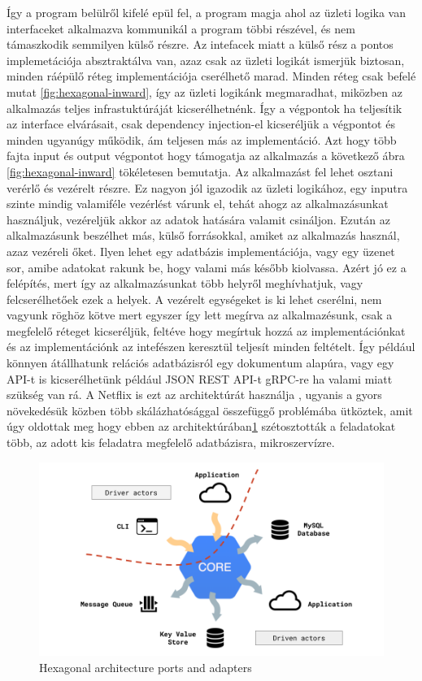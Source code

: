 Így a program belülről kifelé epül fel, a program magja ahol az üzleti logika van interfaceket alkalmazva kommunikál a program többi részével, és nem támaszkodik semmilyen külső részre. Az intefacek miatt a külső rész a pontos implemetációja absztraktálva van, azaz csak az üzleti logikát ismerjük biztosan, minden ráépülő réteg implementációja cserélhető marad.
Minden réteg csak befelé mutat \ref{fig:hexagonal-inward}, így az üzleti logikánk megmaradhat, miközben az alkalmazás teljes infrastuktúráját kicserélhetnénk.
Így a végpontok ha teljesítik az interface elvárásait, csak dependency injection-el kicseréljük a végpontot és minden ugyanúgy működik, ám teljesen más az implementáció.
Azt hogy több fajta input és output végpontot hogy  támogatja az alkalmazás a következő ábra \ref{fig:hexagonal-inward} tökéletesen bemutatja.
Az alkalmazást fel lehet osztani verérlő és vezérelt részre. Ez nagyon jól igazodik az üzleti logikához, egy inputra szinte mindig valamiféle vezérlést várunk el,
tehát ahogz az alkalmazásunkat használjuk, vezéreljük akkor az adatok hatására valamit csináljon. Ezután az alkalmazásunk beszélhet más, külső forrásokkal, amiket az alkalmazás használ, azaz vezéreli őket.
Ilyen lehet egy adatbázis implementációja, vagy egy üzenet sor, amibe adatokat rakunk be, hogy valami más később kiolvassa.
Azért jó ez a felépítés, mert így az alkalmazásunkat több helyről meghívhatjuk, vagy felcserélhetőek ezek a helyek.
A vezérelt egységeket is ki lehet cserélni, nem vagyunk röghöz kötve mert egyszer így lett megírva az alkalmazésunk, csak a megfelelő réteget kicseréljük, feltéve hogy megírtuk hozzá az implementációnkat és az implementációnk
az intefészen keresztül teljesít minden feltételt. Így például könnyen átállhatunk relációs adatbázisról egy dokumentum alapúra, vagy egy API-t is kicserélhetünk például JSON REST API-t gRPC-re ha valami miatt szükség van rá.
A Netflix is ezt az architektúrát használja \cite{netflix}, ugyanis a gyors növekedésük közben több skálázhatósággal összefüggő problémába ütköztek, amit úgy oldottak meg hogy
ebben az architektúrában\ref{fig:hexagonal-actor} szétosztották a feladatokat több, az adott kis feladatra megfelelő adatbázisra, mikroszervízre.
\begin{figure}[h]
    \centering
    \includegraphics[scale=0.3]{images/hexa-actor.png}
    \caption{Hexagonal architecture ports and adapters}
    \label{fig:hexagonal-actor}
\end{figure}

